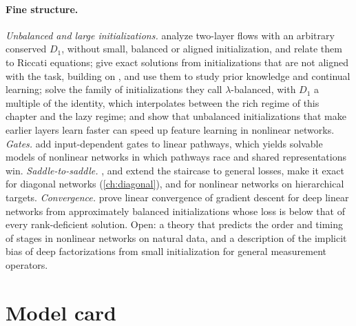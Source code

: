 \begin{refsection}
\paragraph{Fine structure.} \emph{Unbalanced and large initializations.} \Textcite{TarmounEtAl2021} analyze two-layer flows with an arbitrary conserved $D_1$, without small, balanced or aligned initialization, and relate them to Riccati equations; \textcite{BraunEtAl2022} give exact solutions from initializations that are not aligned with the task, building on \textcite{Fukumizu1998}, and use them to study prior knowledge and continual learning; \textcite{DomineEtAl2025} solve the family of initializations they call $\lambda$-balanced, with $D_1$ a multiple of the identity, which interpolates between the rich regime of this chapter and the lazy regime; and \textcite{KuninEtAl2024} show that unbalanced initializations that make earlier layers learn faster can speed up feature learning in nonlinear networks. \emph{Gates.} \Textcite{SaxeSodhaniLewallen2022} add input-dependent gates to linear pathways, which yields solvable models of nonlinear networks in which pathways race and shared representations win. \emph{Saddle-to-saddle.} \Textcite{LiLuoLyu2021}, \textcite{JacotEtAl2021} and \textcite{GidelEtAl2019} extend the staircase to general losses, \textcite{PesmeFlammarion2023} make it exact for diagonal networks (\cref{ch:diagonal}), and \textcite{AbbeEtAl2023} for nonlinear networks on hierarchical targets. \emph{Convergence.} \Textcite{AroraEtAl2019conv} prove linear convergence of gradient descent for deep linear networks from approximately balanced initializations whose loss is below that of every rank-deficient solution. Open: a theory that predicts the order and timing of stages in nonlinear networks on natural data, and a description of the implicit bias of deep factorizations from small initialization for general measurement operators.

\section{Model card}\label{sec:deeplinear:card}


\end{refsection}
